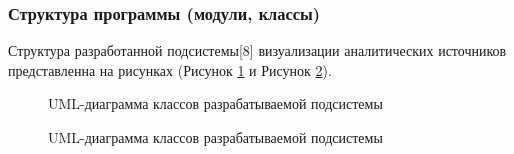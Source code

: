 \documentclass[a4paper]{extarticle}
\numberwithin{equation}{section}
\begin{document}
\subsubsection{Структура программы (модули, классы)}
Структура разработанной подсистемы[8] визуализации аналитических источников представленна на рисунках (Рисунок \ref{umlClassDiagram:ris1} и Рисунок \ref{umlClassDiagram:ris2}).
\begin{figure}[H]
\caption{UML-диаграмма классов разрабатываемой подсистемы}
\label{umlClassDiagram:ris1}
\end{figure}\par
\begin{figure}[H]
\caption{UML-диаграмма классов разрабатываемой подсистемы}
\label{umlClassDiagram:ris2}
\end{figure}\par
\end{document}
